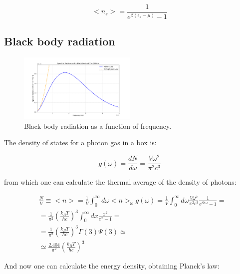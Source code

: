 \documentclass{article}
\begin{document}
\begin{equation}
    <n_s>=\frac{1}{e^{\beta(\epsilon_s-\mu)}-1}
\end{equation}


\subsection{Black body radiation}

\begin{figure}[h]
    \centering
    \includegraphics[width=0.5\textwidth]{images/statistical-physics/black-body.png}
    \caption{Black body radiation as a function of frequency.}
    \label{fig:black-body-radiation}
\end{figure}
The density of states for a photon gas in a box is:

\begin{equation}
    g(\omega)=\frac{d N}{d\omega}=\frac{V\omega^2}{\pi^2c^3}
\end{equation}

from which one can calculate the thermal average of the density of photons:

\begin{equation}
    \begin{aligned}
         & \frac{N}{V}\equiv<n>=\frac{1}{V}\int_0^\infty d\omega <n>_\omega g(\omega)=\frac{1}{V}\int_0^\infty d\omega \frac{V\omega^2}{\pi^2c^3}\frac{1}{e^{\beta\hbar\omega}-1}= \\
         & =\frac{1}{\pi^2}\left(\frac{k_B T}{\hbar c}\right)^3\int_0^\infty dx \frac{x^2}{e^x-1}=                                                                                 \\
         & = \frac{1}{\pi^2}\left(\frac{k_B T}{\hbar c}\right)^3 \Gamma(3)\Psi(3)\simeq                                                                                            \\
         & \simeq \frac{2.404}{\pi^2}\left(\frac{k_B T}{\hbar c}\right)^3
    \end{aligned}
\end{equation}

And now one can calculate the energy density, obtaining Planck's law:
\end{document}
